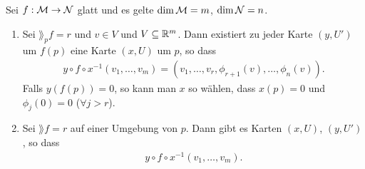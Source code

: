 \begin{satz}
\label{satz:Satz über implizite Funtionen}
\end{satz}
Sei $f: \mathcal{M} \to \mathcal{N}$ glatt und es gelte $\dim\mathcal{M}=m$, $\dim{\mathcal{N}} = n$.
\begin{enumerate}
\item Sei $\rang_p f = r$ und $v \in V$ und $V \subseteq \mathbb{R}^m$. 
Dann existiert zu jeder Karte  $(y, U')$ um $f(p)$ eine Karte $(x, U)$ um $p$, so dass
\begin{align}
y \circ f \circ x^{-1}(v_1, \dots, v_m) = (v_1, \dots, v_r, \phi_{r+1}(v), \dots, \phi_n(v)).
\end{align}
Falls $y(f(p))=0$, so kann man $x$ so wählen, dass $x(p)=0$ und $\phi_j (0) = 0$ ($\forall j > r$).

\item Sei $\rang f = r$ auf einer Umgebung von $p$.
Dann gibt es Karten $(x, U)$, $(y, U')$, so dass 
\begin{align}
y\circ f \circ x^{-1} (v_1, \dots, v_m).
\end{align}

\end{enumerate}
